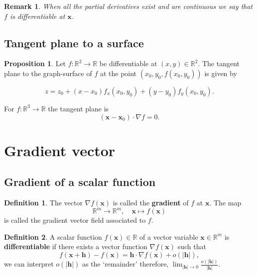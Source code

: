 \documentclass[12pt, a4paper]{article}
\newcommand{\bb}[1]{\mathbb{#1}}
\newcommand{\mb}[1]{\mathbf{#1}}
\newtheorem*{remark}{Remark}
\theoremstyle{definition}
\newtheorem{definition}{Definition}[section]
\newtheorem{proposition}{Proposition}
\theoremstyle{plain}
\begin{document}
\begin{remark}
When all the partial derivatives exist and are continuous we say that $f$ is differentiable at $\mathbf{x}$.
\end{remark}

\subsection{Tangent plane to a surface}

\begin{proposition}
Let $f : \bb{R}^2 \to \bb{R}$ be differentiable at $(x,y) \in \bb{R}^2.$ The tangent plane to the graph-surface of $f$ at the point $(x_0,y_0,f(x_0,y_0))$ is given by 
\begin{tcolorbox}
$$z=z_0+(x-x_0)f_x(x_0,y_0) +(y-y_0)f_y(x_0,y_0).$$
\end{tcolorbox}

\begin{tcolorbox}
For $f :\bb{R}^3 \to \bb{R}$ the tangent plane is $$(\mb{x}-\mb{x}_0)\cdot\nabla f=0.$$
\end{tcolorbox}
\end{proposition}

\section{Gradient vector}

\subsection{Gradient of a scalar function}

\begin{definition}
The vector $\nabla f(\mathbf{x})$ is called the \textbf{gradient} of $f$ at $\mathbf{x}.$ The map $$\bb{R}^m\to\bb{R}^m, \quad \mathbf{x} \mapsto f(\mathbf{x})$$ is called the gradient vector field associated to $f.$
\end{definition}

\begin{definition}
A scalar function $f(\mathbf{x})\in \bb{R}$ of a vector variable $\mathbf{x} \in \bb{R}^m$ is \textbf{differentiable} if there exists a vector function $\nabla f(\mathbf{x})$ such that $$f(\mathbf{x+h})-f(\mathbf{x})=\mathbf{h}\cdot \nabla f(\mathbf{x})+o(|\mathbf{h}|),$$ we can interpret $o(|\mathbf{h}|)$ as the `remainder' therefore, $\lim_{|\mathbf{h}| \to 0} \frac{o(|\mathbf{h}|)}{|\mathbf{h}|}.$
\end{definition}
\end{document}
